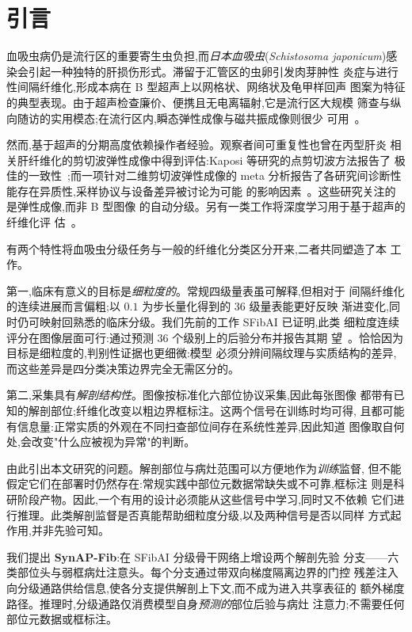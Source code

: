 \section{引言}
\label{sec:intro}

血吸虫病仍是流行区的重要寄生虫负担,而\emph{日本血吸虫}(\emph{Schistosoma
japonicum})感染会引起一种独特的肝损伤形式。滞留于汇管区的虫卵引发肉芽肿性
炎症与进行性间隔纤维化,形成本病在 B 型超声上以网格状、网络状及龟甲样回声
图案为特征的典型表现。由于超声检查廉价、便携且无电离辐射,它是流行区大规模
筛查与纵向随访的实用模态;在流行区内,瞬态弹性成像与磁共振成像则很少
可用~\cite{schistoelasto2018,schistopocus2024}。

然而,基于超声的分期高度依赖操作者经验。观察者间可重复性也曾在丙型肝炎
相关肝纤维化的剪切波弹性成像中得到评估:Kaposi 等研究的点剪切波方法报告了
极佳的一致性~\cite{interobserver2019};而一项针对二维剪切波弹性成像的
meta 分析报告了各研究间诊断性能存在异质性,采样协议与设备差异被讨论为可能
的影响因素~\cite{swe2018staging}。这些研究关注的是弹性成像,而非 B 型图像
的自动分级。另有一类工作将深度学习用于基于超声的纤维化评
估~\cite{usfibrosisgan2022,microflow2023,hfus2025,liverspleen2025}。

有两个特性将血吸虫分级任务与一般的纤维化分类区分开来,二者共同塑造了本
工作。

第一,临床有意义的目标是\emph{细粒度的}。常规四级量表虽可解释,但相对于
间隔纤维化的连续进展而言偏粗;以 $0.1$ 为步长量化得到的 36 级量表能更好反映
渐进变化,同时仍可映射回熟悉的临床分级。我们先前的工作 SFibAI 已证明,此类
细粒度连续评分在图像层面可行:通过预测 36 个级别上的后验分布并报告其期
望~\cite{xu2026sfibai}。恰恰因为目标是细粒度的,判别性证据也更细微:模型
必须分辨间隔纹理与实质结构的差异,而这些差异是四分类决策边界完全无需区分的。

第二,采集具有\emph{解剖结构性}。图像按标准化六部位协议采集,因此每张图像
都带有已知的解剖部位;纤维化改变以粗边界框标注。这两个信号在训练时均可得,
且都可能有信息量:正常实质的外观在不同扫查部位间存在系统性差异,因此知道
图像取自何处,会改变"什么应被视为异常"的判断。

由此引出本文研究的问题。解剖部位与病灶范围可以方便地作为\emph{训练}监督,
但不能假定它们在部署时仍然存在:常规实践中部位元数据常缺失或不可靠,框标注
则是科研阶段产物。因此,一个有用的设计必须能从这些信号中学习,同时又不依赖
它们进行推理。此类解剖监督是否真能帮助细粒度分级,以及两种信号是否以同样
方式起作用,并非先验可知。

我们提出 \textbf{SynAP-Fib}:在 SFibAI 分级骨干网络上增设两个解剖先验
分支——六类部位头与弱框病灶注意头。每个分支通过带双向梯度隔离边界的门控
残差注入向分级通路供给信息,使各分支提供解剖上下文,而不成为进入共享表征的
额外梯度路径。推理时,分级通路仅消费模型自身\emph{预测的}部位后验与病灶
注意力;不需要任何部位元数据或框标注。

